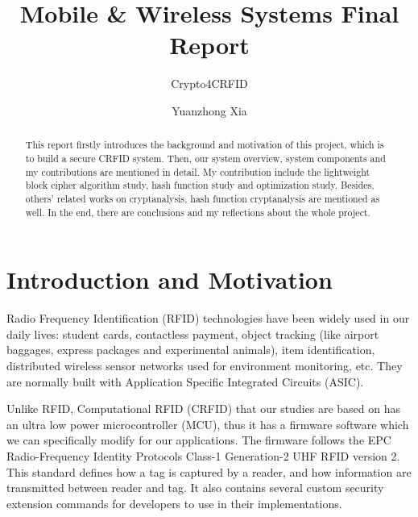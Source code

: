 \documentclass[sigconf, review=false]{acmart}
\let\OldTexttrademark\texttrademark
\renewcommand{\texttrademark}{\OldTexttrademark\xspace}%
\begin{document}
\title{Mobile \& Wireless Systems Final Report}
\subtitle{Crypto4CRFID}

\author{Yuanzhong Xia}

\begin{abstract}
    This report firstly introduces the background and motivation of this project, which is to build a secure CRFID system.
    Then, our system overview, system components and my contributions are mentioned in detail.
    My contribution include the lightweight block cipher algorithm study, hash function study and optimization study.
    Besides, others' related works on cryptanalysis, hash function cryptanalysis are mentioned as well.
    In the end, there are conclusions and my reflections about the whole project.
\end{abstract}
\maketitle



\section{Introduction and Motivation}
Radio Frequency Identification (RFID) technologies have been widely used in our daily lives:
student cards, contactless payment, object tracking (like airport baggages, express packages and experimental animals),
item identification, distributed wireless sensor networks used for environment monitoring, etc. \cite{wikipedia2017rfid}
They are normally built with Application Specific Integrated Circuits (ASIC).

Unlike RFID, Computational RFID (CRFID) that our studies are based on has an ultra low power microcontroller (MCU),
thus it has a firmware software which we can specifically modify for our applications.
The firmware follows the EPC\texttrademark Radio-Frequency Identity Protocols Class-1 Generation-2 UHF RFID version 2\cite{epcglobal2013}.
This standard defines how a tag is captured by a reader, and how information are transmitted between reader and tag.
It also contains several custom security extension commands for developers to use in their implementations.
\end{document}

